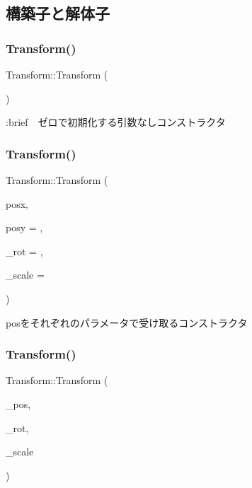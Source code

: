 \subsection{構築子と解体子}
\mbox{\label{class_transform_aa08ca4266efabc768973cdeea51945ab}} 
\subsubsection{\texorpdfstring{Transform()}{Transform()}\hspace{0.1cm}{\footnotesize\ttfamily [1/4]}}
{\footnotesize\ttfamily Transform\+::\+Transform (\begin{DoxyParamCaption}{ }\end{DoxyParamCaption})}

\+:brief　ゼロで初期化する引数なしコンストラクタ \mbox{\label{class_transform_afdda2868df3ca6b122c5e52f7919a692}} 
\subsubsection{\texorpdfstring{Transform()}{Transform()}\hspace{0.1cm}{\footnotesize\ttfamily [2/4]}}
{\footnotesize\ttfamily Transform\+::\+Transform (\begin{DoxyParamCaption}\item[{const float}]{posx,  }\item[{const float}]{posy = {},  }\item[{const float}]{\+\_\+rot = {},  }\item[{const float}]{\+\_\+scale = {} }\end{DoxyParamCaption})}



posをそれぞれのパラメータで受け取るコンストラクタ 

\mbox{\label{class_transform_aae9fd575f9e6e4862ea2d9232340e6dd}} 
\subsubsection{\texorpdfstring{Transform()}{Transform()}\hspace{0.1cm}{\footnotesize\ttfamily [3/4]}}
{\footnotesize\ttfamily Transform\+::\+Transform (\begin{DoxyParamCaption}\item[{const \mbox{\hyperlink{transform_8h_afb0c5e21d4133ff4f200992c0b534e1b}{V\+E\+C2}} \&}]{\+\_\+pos,  }\item[{const float}]{\+\_\+rot,  }\item[{const float}]{\+\_\+scale }\end{DoxyParamCaption})}



